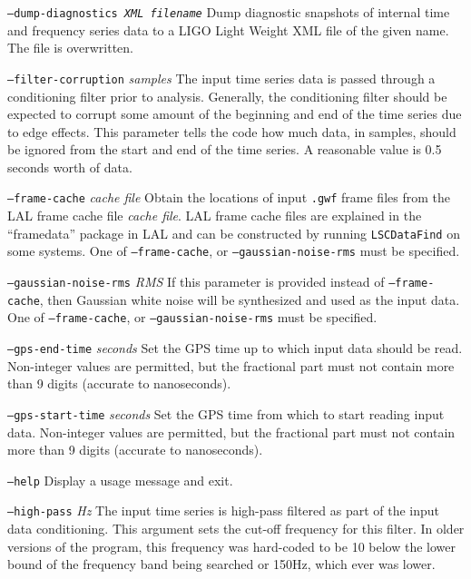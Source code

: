 \documentclass[10pt]{article}
\newcommand{\prog}[1]{\texttt{#1}}
\newcommand{\option}[1]{\texttt{#1}}
\newcommand{\parm}[1]{\textit{#1}}
\newenvironment{entry}%
{\begin{list}{}{\renewcommand{\makelabel}[1]%
{\parbox[b]{\labelwidth}{\makebox[0pt][l]{\textbf{##1}}\\}}%
\setlength{\labelwidth}{1em}%
\setlength{\labelsep}{1em}%
\setlength{\leftmargin}{2em}%
\setlength{\topsep}{\medskipamount}%
\setlength{\itemsep}{\medskipamount}%
\setlength{\parsep}{\medskipamount}%
\setlength{\listparindent}{0pt}}}
{\end{list}}
\begin{document}
\begin{entry}
\begin{entry}
\item[\option{--dump-diagnostics \parm{XML filename}}]
Dump diagnostic snapshots of internal time and frequency series data to a
LIGO Light Weight XML file of the given name.  The file is overwritten.

\item[\option{--filter-corruption} \parm{samples}]
The input time series data is passed through a conditioning filter prior to
analysis.  Generally, the conditioning filter should be expected to corrupt
some amount of the beginning and end of the time series due to edge
effects.  This parameter tells the code how much data, in samples, should
be ignored from the start and end of the time series.  A reasonable value
is 0.5 seconds worth of data.

\item[\option{--frame-cache} \parm{cache file}]
Obtain the locations of input \texttt{.gwf} frame files from the LAL frame
cache file \parm{cache file}.  LAL frame cache files are explained in the
``framedata'' package in LAL and can be constructed by running
\prog{LSCDataFind} on some systems.  One of \option{--frame-cache}, or
\option{--gaussian-noise-rms} must be specified.

\item[\option{--gaussian-noise-rms} \parm{RMS}]
If this parameter is provided instead of \option{--frame-cache}, then
Gaussian white noise will be synthesized and used as the input data.  One
of \option{--frame-cache}, or \option{--gaussian-noise-rms} must be
specified.

\item[\option{--gps-end-time} \parm{seconds}]
Set the GPS time up to which input data should be read.  Non-integer values
are permitted, but the fractional part must not contain more than 9 digits
(accurate to nanoseconds).

\item[\option{--gps-start-time} \parm{seconds}]
Set the GPS time from which to start reading input data.  Non-integer
values are permitted, but the fractional part must not contain more than 9
digits (accurate to nanoseconds).

\item[\option{--help}]
Display a usage message and exit.

\item[\option{--high-pass} \parm{Hz}]
The input time series is high-pass filtered as part of the input data
conditioning.  This argument sets the cut-off frequency for this filter.
In older versions of the program, this frequency was hard-coded to be
\unit{10}{\hertz} below the lower bound of the frequency band being
searched or \unit{150}{Hz}, which ever was lower.


\end{entry}
\end{entry}
\end{document}

